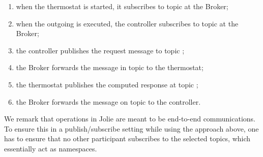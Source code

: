 \begin{enumerate}
  \item when the thermostat is started, it subscribes to topic  at the
  Broker;

  \item when the outgoing  is executed, the controller
  subscribes to topic  at the Broker;

  \item the controller publishes the request message to topic
  ;

  \item the Broker forwards the message in topic  to
  the thermostat;

  \item the thermostat publishes the computed response at topic ;

  \item the Broker forwards the message on topic  to the
  controller.

\end{enumerate}

We remark that  operations in Jolie are meant to be end-to-end
communications. To ensure this in a publish/subscribe setting while using the
approach above, one has to ensure that no other participant subscribes to the
selected topics, which essentially act as namespaces.
